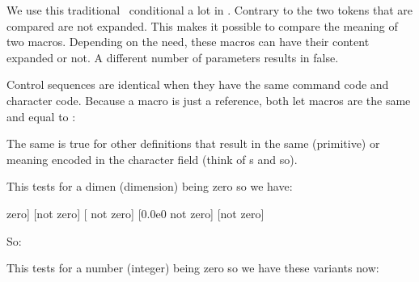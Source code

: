 \stopoldprimitive

\startoldprimitive[title={\prm {ifx}}]

We use this traditional \TEX\ conditional a lot in \CONTEXT. Contrary to 
the two tokens that are compared are not expanded. This makes it possible to compare
the meaning of two macros. Depending on the need, these macros can have their content
expanded or not. A different number of parameters results in false.

Control sequences are identical when they have the same command code and
character code. Because a  macro is just a reference, both let macros
are the same and equal to :

\starttyping
\let\one\relax \let\two\relax
\stoptyping

The same is true for other definitions that result in the same (primitive) or
meaning encoded in the character field (think of s and so).

\stopoldprimitive

\startnewprimitive[title={\prm {ifzerodim}}]

This tests for a dimen (dimension) being zero so we have:

\starttyping
\ifdim<dimension>=0pt
\ifzerodim<dimension>
\ifcase<dimension register>
\stoptyping

\stopnewprimitive

\startnewprimitive[title={\prm {ifzerofloat}}]

As the name indicated, this tests for a zero float value.

\startbuffer
[\scratchfloat\zerofloat \ifzerofloat\scratchfloat \else not \fi zero]
[\scratchfloat\plusone   \ifzerofloat\scratchfloat \else not \fi zero]
[      \ifzerofloat\scratchfloat \else not \fi zero]
[\scratchfloat 0.0e0     \ifzerofloat\scratchfloat \else not \fi zero]
[\scratchfloat \zeropoint\ifzerofloat\scratchfloat \else not \fi zero]
\stopbuffer

\typebuffer

So: \inlinebuffer

\stopnewprimitive

\startnewprimitive[title={\prm {ifzeronum}}]

This tests for a number (integer) being zero so we have these variants now:

\starttyping
{}
\stoptyping

